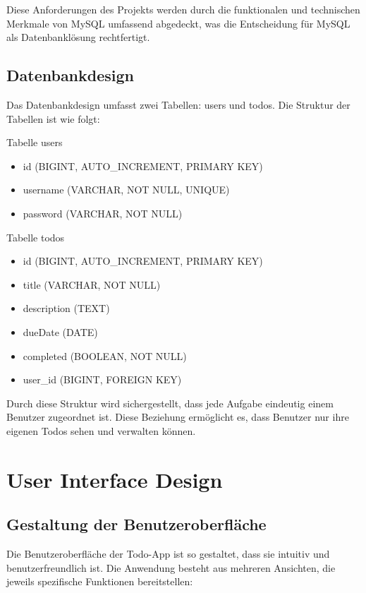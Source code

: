 Diese Anforderungen des Projekts werden durch die funktionalen und technischen Merkmale von MySQL umfassend abgedeckt, was die Entscheidung für MySQL als Datenbanklösung rechtfertigt.


\subsection{Datenbankdesign}

Das Datenbankdesign umfasst zwei Tabellen: users und todos. Die Struktur der Tabellen ist wie folgt:

Tabelle users
\begin{itemize}
	\item id (BIGINT, AUTO\_INCREMENT, PRIMARY KEY)
	\item username (VARCHAR, NOT NULL, UNIQUE)
	\item password (VARCHAR, NOT NULL)
\end{itemize}

Tabelle todos
\begin{itemize}
	\item id (BIGINT, AUTO\_INCREMENT, PRIMARY KEY)
	\item title (VARCHAR, NOT NULL)
	\item description (TEXT)
	\item dueDate (DATE)
	\item completed (BOOLEAN, NOT NULL)
	\item user\_id (BIGINT, FOREIGN KEY)
\end{itemize}

Durch diese Struktur wird sichergestellt, dass jede Aufgabe eindeutig einem Benutzer zugeordnet ist. Diese Beziehung ermöglicht es, dass Benutzer nur ihre eigenen Todos sehen und verwalten können.

\section{User Interface Design}

\subsection{Gestaltung der Benutzeroberfläche}

Die Benutzeroberfläche der Todo-App ist so gestaltet, dass sie intuitiv und benutzerfreundlich ist. Die Anwendung besteht aus mehreren Ansichten, die jeweils spezifische Funktionen bereitstellen:

